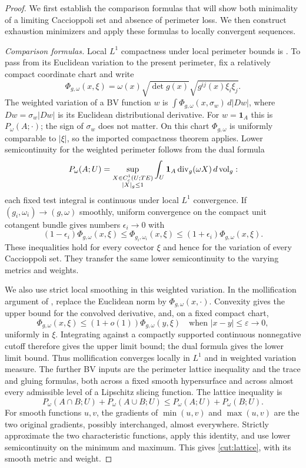 \begin{proof}
We first establish the comparison formulas that will show both
minimality of a limiting Caccioppoli set and absence of perimeter loss. We then
construct exhaustion minimizers and apply these formulas to locally
convergent sequences.

\emph{Comparison formulas.}
Local $L^1$ compactness under local perimeter bounds is
\citet[Chapter~2, Theorem~2.6]{simonGMT}. To pass from its Euclidean
variation to the present perimeter, fix a relatively compact coordinate
chart and write
\[
 \Phi_{g,\omega}(x,\xi)
 =\omega(x)\sqrt{\det g(x)}
       \sqrt{g^{ij}(x)\xi_i\xi_j}.
\]
The weighted variation of a BV function $w$ is
$\int\Phi_{g,\omega}(x,\sigma_w)\,d|Dw|$, where
$Dw=\sigma_w|Dw|$ is its Euclidean distributional derivative.
For $w=\mathbf1_A$ this is $P_\omega(A;\cdot)$; the sign of
$\sigma_w$ does not matter. On this chart $\Phi_{g,\omega}$ is uniformly
comparable to $|\xi|$, so the imported compactness theorem applies.
Lower semicontinuity for the weighted perimeter follows from the dual
formula
\[
 P_\omega(A;U)=
 \sup_{\substack{X\in C_c^1(U;TE)\\ |X|_g\le1}}
       \int_U\mathbf1_A\operatorname{div}_g(\omega X)\,d\operatorname{vol}_g:
\]
each fixed test integral is continuous under local $L^1$ convergence.
If $(g_i,\omega_i)\to(g,\omega)$ smoothly, uniform convergence on the
compact unit cotangent bundle gives numbers $\epsilon_i\to0$ with
\[
 (1-\epsilon_i)\Phi_{g,\omega}(x,\xi)
 \le\Phi_{g_i,\omega_i}(x,\xi)
 \le(1+\epsilon_i)\Phi_{g,\omega}(x,\xi).
\]
These inequalities hold for every covector $\xi$ and hence for the
variation of every Caccioppoli set. They transfer the same lower semicontinuity
to the varying metrics and weights.

We also use strict local smoothing in this weighted variation. In the
mollification argument of \citet[Chapter~2, Lemma~2.5]{simonGMT}, replace
the Euclidean norm by $\Phi_{g,\omega}(x,\cdot)$. Convexity gives the
upper bound for the convolved derivative, and, on a fixed compact chart,
\[
 \Phi_{g,\omega}(x,\xi)
 \le (1+o(1))\Phi_{g,\omega}(y,\xi)
 \quad\text{when }|x-y|\le\varepsilon\longrightarrow0,
\]
uniformly in $\xi$. Integrating against a compactly supported continuous
nonnegative cutoff therefore gives the upper limit bound; the dual
formula gives the lower limit bound. Thus mollification converges
locally in $L^1$ and in weighted variation measure. The further BV inputs are the perimeter
lattice inequality and the trace and gluing formulas, both across a
fixed smooth hypersurface and across almost every admissible level of a
Lipschitz slicing function. The lattice inequality is
\begin{equation}\label{cut:lattice}
 P_\omega(A\cap B;U)+P_\omega(A\cup B;U)
          \le P_\omega(A;U)+P_\omega(B;U).
\end{equation}
For smooth functions $u,v$, the gradients of $\min(u,v)$
and $\max(u,v)$ are the two original gradients, possibly interchanged,
almost everywhere.  Strictly approximate the two characteristic
functions, apply this identity, and use lower semicontinuity on the
minimum and maximum.  This gives \eqref{cut:lattice}, with its smooth
metric and weight.


\end{proof}
